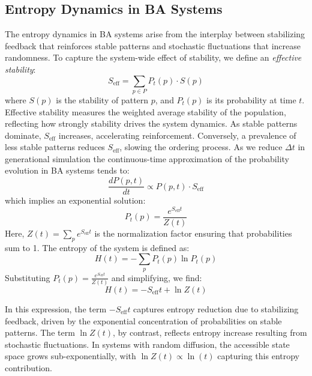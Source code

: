 \documentclass[entropy,article,submit,pdftex,moreauthors]{Definitions/mdpi}
\begin{document}
\subsection{Entropy Dynamics in BA Systems}

The entropy dynamics in BA systems arise from the interplay between stabilizing feedback that reinforces stable patterns and stochastic fluctuations that increase randomness. To capture the system-wide effect of stability, we define an \emph{effective stability}:
\begin{equation}
S_{\mathrm{eff}} = \sum_{p \in P} P_t(p) \cdot S(p)
\end{equation}
where \( S(p) \) is the stability of pattern \( p \), and \( P_t(p) \) is its probability at time \( t \). Effective stability measures the weighted average stability of the population, reflecting how strongly stability drives the system dynamics. As stable patterns dominate, \( S_{\mathrm{eff}} \) increases, accelerating reinforcement. Conversely, a prevalence of less stable patterns reduces \( S_{\mathrm{eff}} \), slowing the ordering process. As we reduce $\Delta t$ in generational simulation the continuous-time approximation of the probability evolution in BA systems tends to:
\begin{equation}
\frac{dP(p,t)}{dt} \propto P(p,t) \cdot S_{\mathrm{eff}}
\end{equation}
which implies an exponential solution:
\begin{equation}
P_t(p) = \frac{e^{S_{\mathrm{eff}} t}}{Z(t)}
\end{equation}
Here, \( Z(t) = \sum_{p} e^{S_{\mathrm{eff}} t} \) is the normalization factor ensuring that probabilities sum to 1. The entropy of the system is defined as:
\begin{equation}
H(t) = -\sum_{p} P_t(p) \ln P_t(p)
\end{equation}
Substituting \( P_t(p) = \frac{e^{S_{\mathrm{eff}} t}}{Z(t)} \) and simplifying, we find:
\begin{equation}
H(t) = -S_{\mathrm{eff}} t + \ln Z(t)
\end{equation}

In this expression, the term \( -S_{\mathrm{eff}} t \) captures entropy reduction due to stabilizing feedback, driven by the exponential concentration of probabilities on stable patterns. The term \( \ln Z(t) \), by contrast, reflects entropy increase resulting from stochastic fluctuations. In systems with random diffusion, the accessible state space grows sub-exponentially, with \( \ln Z(t) \propto \ln(t) \) capturing this entropy contribution.
\end{document}
